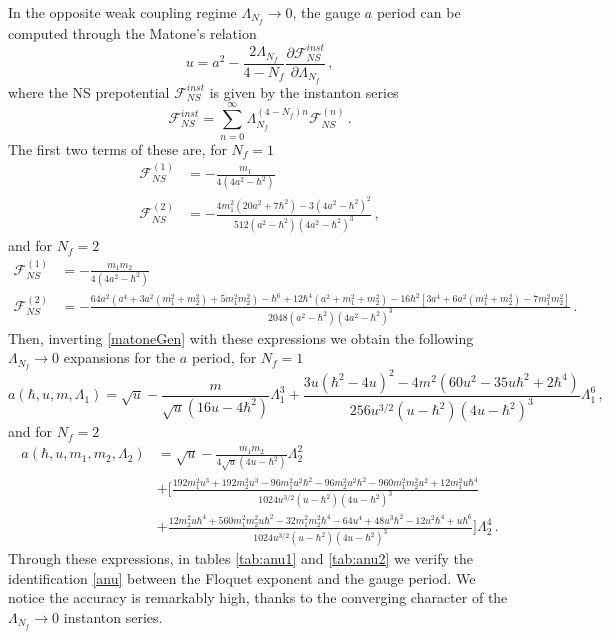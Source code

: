 \documentclass[11pt,a4paper]{elsarticle}
\def \ba {\begin{aligned}}
\def \ea {\end{aligned}}
\newcommand{\be}{\begin{equation}}
\newcommand{\ee}{\end{equation}}
\numberwithin{figure}{section}
\numberwithin{table}{section}
\begin{document}
In the opposite weak coupling regime $\Lambda_{N_f}\to 0$, the gauge $a$ period can be computed through the Matone's relation%
\be \label{matoneGen}
 u =  a^2 - \frac{2\Lambda_{N_f}}{4-N_f} \frac{\partial \mathcal{F}_{NS}^{inst}}{\partial \Lambda_{N_f}}  \,,
\ee 
where the NS prepotential $\mathcal{F}_{NS}^{inst}$ is given by the instanton series
\be
\mathcal{F}_{NS}^{inst} = \sum_{n=0}^\infty \Lambda_{N_f}^{(4- N_f)n} \mathcal{F}_{NS}^{(n)}\,.
\ee
The first two terms of these are, for $N_f=1$
\be 
\ba 
\mathcal{F}_{NS}^{(1)} &=- \frac{  m_1}{4(4 a^2- \hbar^2)} \\
\mathcal{F}_{NS}^{(2)} &=-\frac{4 m_1^2 \left(20 a^2+7 \hbar ^2\right)-3 \left(4 a^2-\hbar ^2\right)^2}{512 \left(a^2-\hbar ^2\right) \left(4 a^2-\hbar ^2\right)^3} \,,%
\ea 
\ee
and for $N_f=2$
\small
\be 
\ba \label{FinstNf=2}
\mathcal{F}_{NS}^{(1)} &=- \frac{ m_1 m_2}{4(4 a^2- \hbar^2)}  \\
\mathcal{F}_{NS}^{(2)} &=-\frac{64 a^2(a^4+3 a^2(m_1^2+m_2^2)+5m_1^2 m_2^2)- \hbar^6+12\hbar^4(a^2+m_1^2+m_2^2)-16 \hbar^2[3a^4+6a^2(m_1^2+m_2^2)-7m_1^2m_2^2]}{2048 \left(a^2-\hbar ^2\right) \left(4 a^2-\hbar ^2\right)^3} \,.
\ea 
\ee
\normalsize
Then, inverting \eqref{matoneGen} with these expressions we obtain the following $\Lambda_{N_f}\to 0$ expansions for the $a$ period, for $N_f=1$
\be \label{ainstex1}
a(\hbar,u,m,\Lambda_1)=\sqrt{u}-\frac{ m}{\sqrt{u} \left(16 u-4 \hbar ^2\right)}\Lambda _1^3+\frac{ 3 u \left(\hbar ^2-4 u\right)^2-4 m^2 \left(60 u^2-35 u \hbar ^2+2 \hbar ^4\right) }{256 u^{3/2} \left(u-\hbar ^2\right) \left(4 u-\hbar ^2\right)^3}\Lambda _1^6\,,
\ee
and for $N_f=2$
\small
\be
\ba \label{ainstex2}
a(\hbar,u,m_1,m_2,\Lambda_2)&=\sqrt{u}-\frac{ m_1 m_2}{4 \sqrt{u} \left(4 u-\hbar ^2\right)}\Lambda _2^2 \\
&+\Biggl[\frac{192 m_1^2 u^3+192 m_2^2 u^3-96 m_1^2 u^2 \hbar ^2-96 m_2^2 u^2 \hbar ^2-960 m_1^2 m_2^2 u^2+12 m_1^2 u \hbar ^4}{1024 u^{3/2} \left(u-\hbar ^2\right) \left(4 u-\hbar ^2\right)^3}\\
&+\frac{12 m_2^2 u \hbar ^4+560 m_1^2 m_2^2 u \hbar ^2-32 m_1^2 m_2^2 \hbar ^4-64 u^4+48 u^3 \hbar ^2-12 u^2 \hbar ^4+u \hbar ^6}{1024 u^{3/2} \left(u-\hbar ^2\right) \left(4 u-\hbar ^2\right)^3} \Biggr]\Lambda_2^4\,.
\ea
\ee
\normalsize
Through these expressions, in tables \ref{tab:anu1} and \ref{tab:anu2} we verify the identification \eqref{anu} between the Floquet exponent and the gauge period. We notice the accuracy is remarkably high, thanks to the converging character of the $\Lambda_{N_f}\to 0$ instanton series. 
\end{document}
